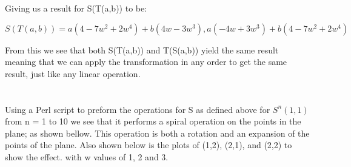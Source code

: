 \documentclass[12pt]{article}
\begin{document}
Giving us a result for S(T(a,b)) to be:

$$ S(T(a,b)) =  a(4 - 7w^{2} + 2w^{4}) + b(4w-3w^{3}) , a(-4w+3w^{3}) + b(4-7w^{2}+2w^{4}) $$

From this we see that both S(T(a,b)) and T(S(a,b)) yield the same result meaning that we can apply the transformation in any order to get the same result, just like any linear operation.

\section{}

Using a Perl script to preform the operations for S as defined above for $S^{n}(1,1)$ from n = 1 to 10 we see that it performs a spiral operation on the points in the plane; as shown bellow. This operation is both a rotation and an expansion of the points of the plane. Also shown below is the plots of (1,2), (2,1), and (2,2) to show the effect. with w values of 1, 2 and 3.  
\end{document}
